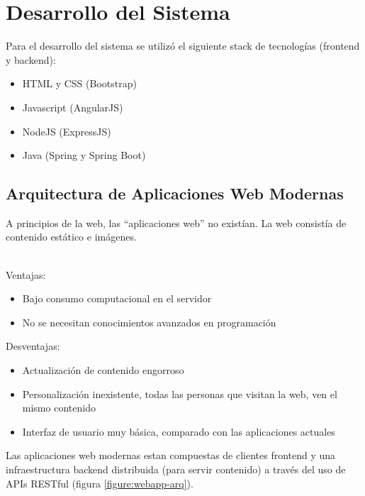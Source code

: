 \section{Desarrollo del Sistema}
	
	Para el desarrollo del sistema se utilizó el siguiente stack de tecnologías
	(frontend y backend):
	
	\begin{itemize}
	  \item HTML y CSS (Bootstrap)
	  \item Javascript (AngularJS)
	  \item NodeJS (ExpressJS)
	  \item Java (Spring y Spring Boot)
	\end{itemize}
	
	\subsection{Arquitectura de Aplicaciones Web Modernas}
		A principios de la web, las ``aplicaciones web'' no existían. La web
  		consistía de contenido estático e imágenes.\\\
  
  		Ventajas:
  
  		\begin{itemize}
			\item Bajo consumo computacional en el servidor
			\item No se necesitan conocimientos avanzados en programación  
		\end{itemize}
		
		Desventajas:
		
		\begin{itemize}
			\item Actualización de contenido engorroso
			\item Personalización inexistente, todas las personas que visitan la web, ven
			el mismo contenido
			
			\item Interfaz de usuario muy básica, comparado con las aplicaciones actuales
		\end{itemize}
		
		Las aplicaciones web modernas estan compuestas de clientes frontend y una
		infraestructura backend distribuida (para servir contenido) a través del
		uso de APIs RESTful (figura \ref{figure:webapp-arq}).
		
